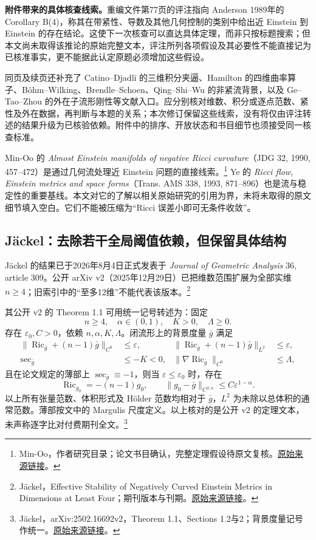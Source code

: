 \documentclass[11pt,a4paper]{article}
\theoremstyle{definition}
\newcommand{\Ric}{\operatorname{Ric}}
\newcommand{\src}[3]{\footnote{\raggedright #1，#2。\href{#3}{原始来源链接}。}}
\begin{document}
\textbf{附件带来的具体核查线索。}重编文件第77页的评注指向 Anderson 1989年的 Corollary B(4)，称其在带紧性、导数及其他几何控制的类别中给出近 Einstein 到 Einstein 的存在结论。这使下一次核查可以直达具体定理，而非只按标题搜索；但本文尚未取得该推论的原始完整文本，评注所列各项假设及其必要性不能直接记为已核准事实，更不能据此认定原题必须增加这些假设。

同页及续页还补充了 Catino--Djadli 的三维积分夹逼、Hamilton 的四维曲率算子、Böhm--Wilking、Brendle--Schoen、Qing--Shi--Wu 的非紧流背景，以及 Ge--Tao--Zhou 的外在子流形刚性等文献入口。应分别核对维数、积分或逐点范数、紧性及外在数据，再判断与本题的关系；本次修订保留这些线索，没有将仅由评注转述的结果升级为已核验依赖。附件中的排序、开放状态和书目细节也须接受同一核查标准。

Min-Oo 的 \emph{Almost Einstein manifolds of negative Ricci curvature}（JDG 32, 1990, 457--472）是通过几何流处理近 Einstein 问题的直接线索。\src{Min-Oo}{作者研究目录；论文书目确认，完整定理假设待原文复核}{https://math.mcmaster.ca/minoo/research.html}
Ye 的 \emph{Ricci flow, Einstein metrics and space forms}（Trans. AMS 338, 1993, 871--896）也是流与稳定性的重要基线。本文对它的了解以相关原始研究的引用为界，未将未取得的原文细节填入空白。它们不能被压缩为“Ricci 误差小即可无条件收敛”。

\subsection{Jäckel：去除若干全局阈值依赖，但保留具体结构}

Jäckel 的结果已于2026年8月4日正式发表于 \emph{Journal of Geometric Analysis} 36, article 309。公开 arXiv v2（2025年12月29日）已把维数范围扩展为全部实维 $n\ge4$；旧索引中的“至多12维”不能代表该版本。\src{Jäckel}{Effective Stability of Negatively Curved Einstein Metrics in Dimensions at Least Four；期刊版本与刊期}{https://link.springer.com/article/10.1007/s12220-026-02563-1}

其公开 v2 的 Theorem 1.1 可用统一记号转述为：固定
\[
n\ge4,\quad\alpha\in(0,1),\quad K>0,\quad\Lambda\ge0.
\]
存在 $\varepsilon_0,C>0$，依赖 $n,\alpha,K,\Lambda$。闭流形上的背景度量 $\bar g$ 满足
\begin{align*}
\|\Ric_{\bar g}+(n-1)\bar g\|_{C^0}&\le\varepsilon, &
\|\Ric_{\bar g}+(n-1)\bar g\|_{L^2}&\le\varepsilon,\\
\sec_{\bar g}&\le-K<0, &
\|\nabla\Ric_{\bar g}\|_{C^0}&\le\Lambda,
\end{align*}
且在论文规定的薄部上 $\sec_{\bar g}\equiv-1$，则当 $\varepsilon\le\varepsilon_0$ 时，存在
\[
\Ric_{g_0}=-(n-1)g_0,\qquad
\|g_0-\bar g\|_{C^{2,\alpha}}\le C\varepsilon^{1-\alpha}.
\]
以上所有张量范数、体积形式及 Hölder 范数均相对于 $\bar g$，$L^2$ 为未除以总体积的通常范数。薄部按文中的 Margulis 尺度定义。以上核对的是公开 v2 的定理文本，未声称逐字比对付费期刊全文。\src{Jäckel}{arXiv:2502.16692v2，Theorem 1.1、Sections 1.2与2；背景度量记号作统一}{https://arxiv.org/html/2502.16692v2}
\end{document}
